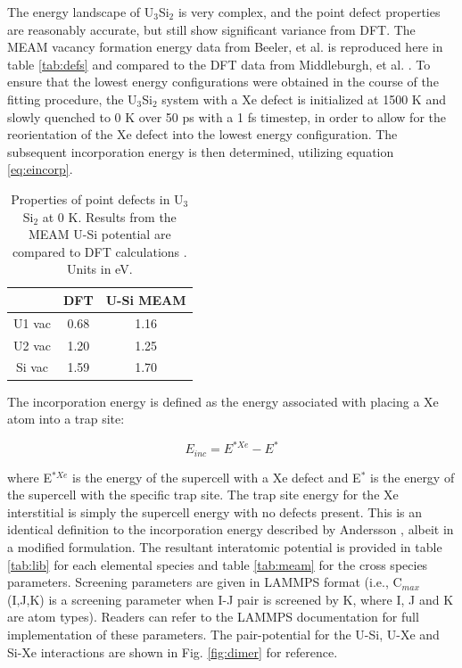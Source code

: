 \documentclass[review]{elsarticle}
\begin{document}
The energy landscape of U$_3$Si$_2$ is very complex, and the point defect properties are reasonably accurate, but still show significant variance from DFT. The MEAM vacancy formation energy data from Beeler, et al. \cite{beelerusi} is reproduced here in table \ref{tab:defs} and compared to the DFT data from Middleburgh, et al. \cite{middleburgh2016}. To ensure that the lowest energy configurations were obtained in the course of the fitting procedure, the U$_3$Si$_2$ system with a Xe defect is initialized at 1500 K and slowly quenched to 0 K over 50 ps with a 1 fs timestep, in order to allow for the reorientation of the Xe defect into the lowest energy configuration. The subsequent incorporation energy is then determined, utilizing equation \ref{eq:eincorp}. 

\begin{table}[h!]
\caption{Properties of point defects in U$_{3}$Si$_{2}$ at 0 K. Results from the MEAM U-Si potential are compared to DFT calculations \cite{middleburgh2016}. Units in eV.}\label{tab:defs}
\begin{center}
\begin{tabular}{|c|c|c|}
 \hline
 & DFT & U-Si MEAM \\
 \hline
 U1 vac & 0.68 & 1.16 \\
 U2 vac & 1.20 & 1.25 \\
 Si vac & 1.59 & 1.70 \\
 \hline
\end{tabular}
\end{center}
\label{default}
\end{table}%

The incorporation energy is defined as the energy associated with placing a Xe atom into a trap site:

\begin{equation}
\label{eq:eincorp}
E_{inc} = E^{*Xe} - E^*
\end{equation}

where E$^{*Xe}$ is the energy of the supercell with a Xe defect and E$^*$ is the energy of the supercell with the specific trap site. The trap site energy for the Xe interstitial is simply the supercell energy with no defects present. This is an identical definition to the incorporation energy described by Andersson \cite{andersson2018}, albeit in a modified formulation. The resultant interatomic potential is provided in table \ref{tab:lib} for each elemental species and table \ref{tab:meam} for the cross species parameters. Screening parameters are given in LAMMPS format (i.e., C$_{max}$(I,J,K) is a screening parameter when I-J pair is screened by K, where I, J and K are atom types). Readers can refer to the LAMMPS \cite{plimpton1995} documentation for full implementation of these parameters. The pair-potential for the U-Si, U-Xe and Si-Xe interactions are shown in Fig. \ref{fig:dimer} for reference.
\end{document}

